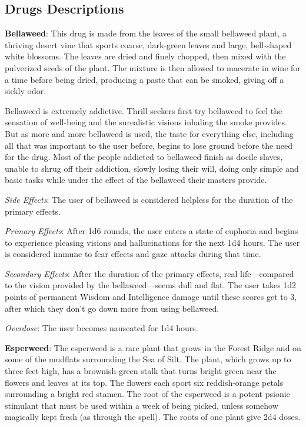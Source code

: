 \subsection{Drugs Descriptions}

\textbf{Bellaweed}: This drug is made from the leaves of the small bellaweed plant, a thriving desert vine that sports coarse, dark-green leaves and large, bell-shaped white blossoms. The leaves are dried and finely chopped, then mixed with the pulverized seeds of the plant. The mixture is then allowed to macerate in wine for a time before being dried, producing a paste that can be smoked, giving off a sickly odor.

Bellaweed is extremely addictive. Thrill seekers first try bellaweed to feel the sensation of well-being and the surealistic visions inhaling the smoke provides. But as more and more bellaweed is used, the taste for everything else, including all that was important to the user before, begins to lose ground before the need for the drug. Most of the people addicted to bellaweed finish as docile slaves, unable to shrug off their addiction, slowly losing their will, doing only simple and basic tasks while under the effect of the bellaweed their masters provide.

\textit{Side Effects}: The user of bellaweed is considered helpless for the duration of the primary effects.

\textit{Primary Effects}: After 1d6 rounds, the user enters a state of euphoria and begins to experience pleasing visions and hallucinations for the next 1d4 hours. The user is considered immune to fear effects and gaze attacks during that time.

\textit{Secondary Effects}: After the duration of the primary effects, real life---compared to the vision provided by the bellaweed---seems dull and flat. The user takes 1d2 points of permanent Wisdom and Intelligence damage until these scores get to 3, after which they don't go down more from using bellaweed.

\textit{Overdose}: The user becomes nauseated for 1d4 hours.

\textbf{Esperweed}: The esperweed is a rare plant that grows in the Forest Ridge and on some of the mudflats surrounding the Sea of Silt. The plant, which grows up to three feet high, has a brownish-green stalk that turns bright green near the flowers and leaves at its top. The flowers each sport six reddish-orange petals surrounding a bright red stamen. The root of the esperweed is a potent psionic stimulant that must be used within a week of being picked, unless somehow magically kept fresh (as through the  spell). The roots of one plant give 2d4 doses.

